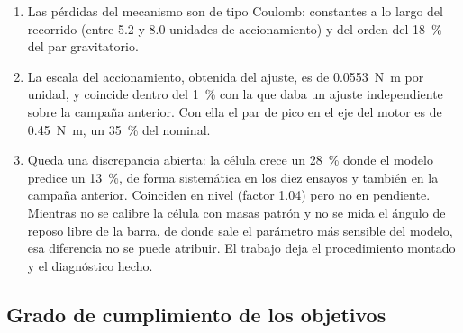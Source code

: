 \begin{enumerate}
        tensión sólo varía un \SI{13}{\percent} (modelo) o un \SI{28}{\percent} (célula) sobre el
        tramo útil, porque el brazo del peso y el del cable crecen a la vez. Donde la tensión variase
        el doble o el triple, el mismo tambor recortaría el motor en esa proporción. Perseguir
        además un perfil de par exactamente constante no compensa, y choca con el hecho de que el
        cable sólo se asienta sobre perfiles convexos de pendiente suave.
  \item Las pérdidas del mecanismo son de tipo Coulomb: constantes a lo largo del recorrido
        (entre \num{5.2} y \num{8.0} unidades de accionamiento) y del orden del \SI{18}{\percent}
        del par gravitatorio.
  \item La escala del accionamiento, obtenida del ajuste, es de \SI{0.0553}{\newton\metre} por
        unidad, y coincide dentro del \SI{1}{\percent} con la que daba un ajuste independiente sobre
        la campaña anterior. Con ella el par de pico en el eje del motor es de
        \SI{0.45}{\newton\metre}, un \SI{35}{\percent} del nominal.
  \item Queda una discrepancia abierta: la célula crece un \SI{28}{\percent} donde el modelo predice
        un \SI{13}{\percent}, de forma sistemática en los diez ensayos y también en la campaña
        anterior. Coinciden en nivel (factor \num{1.04}) pero no en pendiente. Mientras no se calibre la célula con masas patrón y no se
        mida el ángulo de reposo libre de la barra, de donde sale el parámetro más sensible del
        modelo, esa diferencia no se puede atribuir. El trabajo deja el procedimiento montado y el
        diagnóstico hecho.
\end{enumerate}

\subsection{Grado de cumplimiento de los objetivos}

